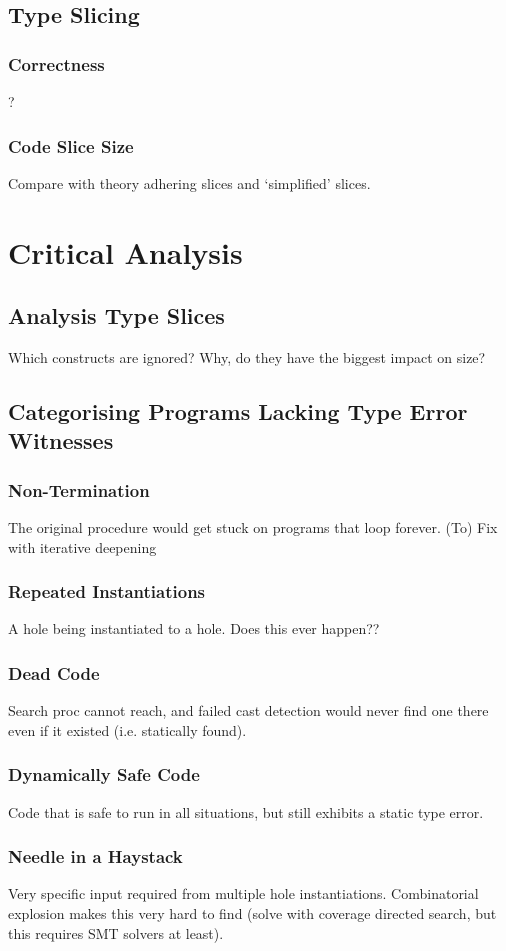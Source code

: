 \subsection{Type Slicing}
\subsubsection{Correctness}
?
\subsubsection{Code Slice Size}
Compare with theory adhering slices and `simplified' slices.

\section{Critical Analysis}
\subsection{Analysis Type Slices}
Which constructs are ignored? Why, do they have the biggest impact on size?
\subsection{Categorising Programs Lacking Type Error Witnesses}
\subsubsection{Non-Termination}
The original procedure would get stuck on programs that loop forever. (To) Fix with iterative deepening
\subsubsection{Repeated Instantiations}
A hole being instantiated to a hole. Does this ever happen??
\subsubsection{Dead Code}
Search proc cannot reach, and failed cast detection would never find one there even if it existed (i.e. statically found).
\subsubsection{Dynamically Safe Code}
Code that is safe to run in all situations, but still exhibits a static type error.

\subsubsection{Needle in a Haystack}
Very specific input required from multiple hole instantiations. Combinatorial explosion makes this very hard to find (solve with coverage directed search, but this requires SMT solvers at least).

